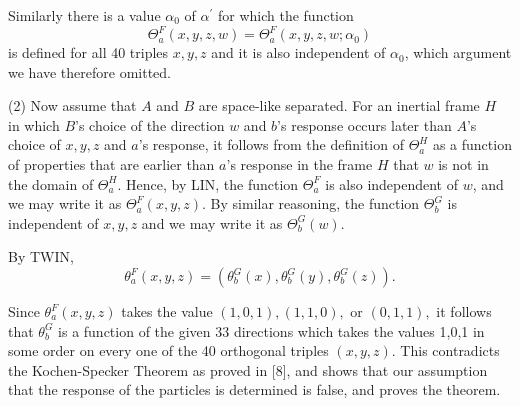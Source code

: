 \documentclass[12pt]{article}
\begin{document}
Similarly there is a value $\alpha_0$ of $\alpha^\prime$ for which the function \[\Theta^F_a(x,y,z,w) = \Theta^F_a(x,y,z,w;\alpha_0)\] is defined for all 40 triples $x,y,z$ and it is also independent of $\alpha_0$, which argument we have therefore omitted.

(2) Now assume that $A$ and $B$ are space-like separated.  For an inertial frame $H$ in which $B$'s choice of the direction $w$ and $b$'s response occurs later than $A$'s choice of $x,y,z$ and $a$'s response, it follows from the definition of $\Theta_a^H$ as a function of properties that are earlier than $a$'s response in the frame $H$ that $w$ is not in the domain of $\Theta_a^H.$ Hence, by LIN, the function $\Theta_a^F$ is also independent of $w$, and we may write it as $\Theta_a^F(x,y,z).$ By similar reasoning, the function $\Theta_b^G$ is independent of $x,y,z$ and we may write it as $\Theta_b^G(w).$


By TWIN,                                              \[\theta_a^F(x,y,z)  =  (\theta_b^G(x), \theta_b^G(y), \theta_b^G(z)).\]                                                                                                                                                              

 Since $\theta_a^F(x,y,z)$ takes the value $(1,0,1), (1,1,0),$ or $(0,1,1),$ it follows that $\theta_b^G$ is a function of the given 33 directions which takes the values 1,0,1 in some order on every one of the 40 orthogonal triples $(x,y,z).$ This contradicts the Kochen-Specker Theorem as proved in [8], and shows that our assumption that the response of the particles is determined is false, and proves the theorem.


\newpage


\end{document}
